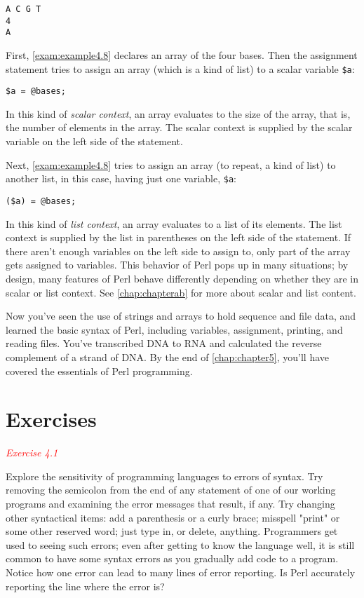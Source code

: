 \begin{lstlisting}
A C G T
4
A
\end{lstlisting}

First, \autoref{exam:example4.8} declares an array of the four bases. Then the assignment statement tries to assign an array (which is a kind of list) to a scalar variable \verb|$a|: 

\begin{lstlisting}
$a = @bases;
\end{lstlisting}

In this kind of \textit{scalar context}, an array evaluates to the size of the array, that is, the number of elements in the array. The scalar context is supplied by the scalar variable on the left side of the statement.

Next, \autoref{exam:example4.8} tries to assign an array (to repeat, a kind of list) to another list, in this case, having just one variable, \verb|$a|:

\begin{lstlisting}
($a) = @bases;
\end{lstlisting}

In this kind of \textit{list context}, an array evaluates to a list of its elements. The list context is supplied by the list in parentheses on the left side of the statement. If there aren't enough variables on the left side to assign to, only part of the array gets assigned to variables.  This behavior of Perl pops up in many situations; by design, many features of Perl behave differently depending on whether they are in scalar or list context. See \autoref{chap:chapterab} for more about scalar and list content.

Now you've seen the use of strings and arrays to hold sequence and file data, and learned the basic syntax of Perl, including variables, assignment, printing, and reading files. You've transcribed DNA to RNA and calculated the reverse complement of a strand of DNA. By the end of \autoref{chap:chapter5}, you'll have covered the essentials of Perl programming. 

\section{Exercises}
\textcolor{red}{\textit{Exercise 4.1}}
\begin{adjustwidth}{1cm}{}
Explore the sensitivity of programming languages to errors of syntax.  Try removing the semicolon from the end of any statement of one of our working programs and examining the error messages that result, if any.  Try changing other syntactical items: add a parenthesis or a curly brace; misspell "print" or some other reserved word; just type in, or delete, anything. Programmers get used to seeing such errors; even after getting to know the language well, it is still common to have some syntax errors as you gradually add code to a program. Notice how one error can lead to many lines of error reporting. Is Perl accurately reporting the line where the error is? 
\end{adjustwidth}

